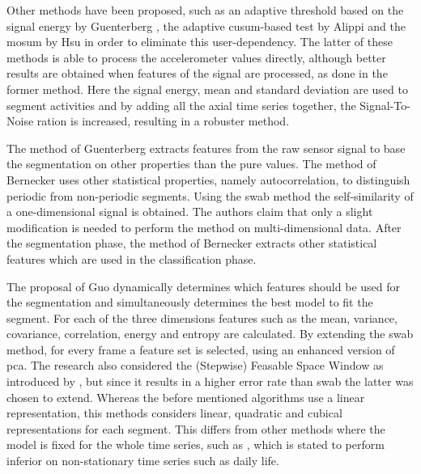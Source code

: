 Other methods have been proposed, such as an adaptive threshold based on the signal energy by Guenterberg \etal \cite{guenterberg2009automatic}, the adaptive \gls{cusum}-based test by Alippi \etal \cite{alippi2006adaptive} and the \gls{mosum} by Hsu \cite{hsu2007mosum} in order to eliminate this user-dependency.
The latter of these methods is able to process the accelerometer values directly, although better results are obtained when features of the signal are processed, as done in the former method.
Here the signal energy, mean and standard deviation are used to segment activities and by adding all the axial time series together, the Signal-To-Noise ration is increased, resulting in a robuster method.

The method of Guenterberg \etal extracts features from the raw sensor signal to base the segmentation on other properties than the pure values.
The method of Bernecker \etal \cite{bernecker2012activity} uses other statistical properties, namely autocorrelation, to distinguish periodic from non-periodic segments.
Using the \gls{swab} method the self-similarity of a one-dimensional signal is obtained.
The authors claim that only a slight modification is needed to perform the method on multi-dimensional data.
After the segmentation phase, the method of Bernecker \etal extracts other statistical features which are used in the classification phase.

The proposal of Guo \etal \cite{guo2012adaptive} dynamically determines which features should be used for the segmentation and simultaneously determines the best model to fit the segment.
For each of the three dimensions features such as the mean, variance, covariance, correlation, energy and entropy are calculated.
By extending the \gls{swab} method, for every frame a feature set is selected, using an enhanced version of \gls{pca}.
The research also considered the (Stepwise) Feasable Space Window as introduced by \cite{liu2008novel}, but since it results in a higher error rate than \gls{swab} the latter was chosen to extend.
Whereas the before mentioned algorithms use a linear representation, this methods considers linear, quadratic and cubical representations for each segment.
This differs from other methods where the model is fixed for the whole time series, such as \cite{fuchs2010online}, which is stated to perform inferior on non-stationary time series such as daily life.


